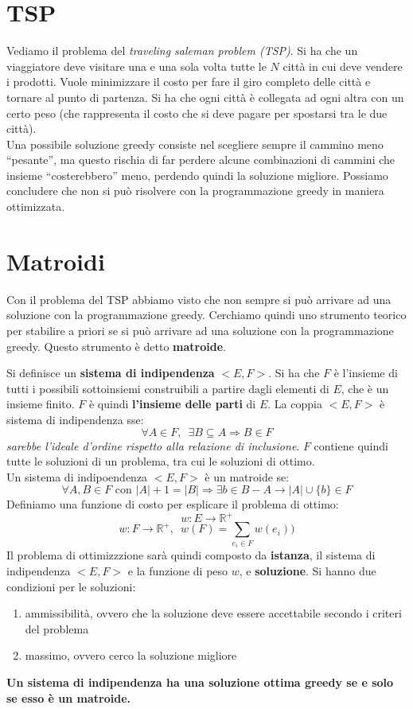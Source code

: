 \documentclass[a4paper,12pt, oneside]{book}
\begin{document}
\section{TSP}
Vediamo il problema del \textit{traveling saleman problem (TSP)}. Si
ha che un viaggiatore deve visitare una e una sola volta tutte le $N$
città in cui deve vendere i prodotti. Vuole minimizzare il costo per
fare il giro completo delle città e tornare al punto di partenza. Si
ha che ogni città è collegata ad ogni altra con un certo peso (che
rappresenta il costo che si deve pagare per spostarsi tra le due
città).\\
Una possibile soluzione greedy consiste nel scegliere sempre il
cammino meno ``pesante'', ma questo rischia di far perdere alcune
combinazioni di cammini che insieme ``costerebbero'' meno, perdendo
quindi la soluzione migliore. Possiamo concludere che non si può
risolvere con la programmazione greedy in maniera ottimizzata.
\section{Matroidi}
Con il problema del TSP abbiamo visto che non sempre si può arrivare
ad una soluzione con la programmazione greedy. Cerchiamo quindi uno
strumento teorico per stabilire a priori se si può arrivare ad una
soluzione con la programmazione greedy. Questo strumento è detto
\textbf{matroide}.
\begin{definizione}
  Si definisce un \textbf{sistema di indipendenza} $<E,F>$. Si ha che
  $F$ è l'insieme di tutti i possibili sottoinsiemi construibili a
  partire dagli elementi di $E$, che è un insieme finito. $F$ è quindi
  \textbf{l'insieme delle parti} di $E$. La coppia $<E,F>$ è sistema
  di indipendenza sse:
  \[\forall A\in F,\,\,\, \exists B\subseteq A\Rightarrow B\in F\]
  \textit{sarebbe l'ideale d’ordine rispetto alla relazione di
    inclusione}. $F$ contiene quindi tutte le soluzioni di un
  problema, tra cui le soluzioni di ottimo.\\
  Un sistema di indipoendenza $<E,F>$ è un matroide se:
  \[\forall A,B\in F\mbox{ con }|A|+1=|B|\Longrightarrow\exists b\in
    B-A\to |A|\cup \{b\}\in F\]
  Definiamo una funzione di costo per esplicare il problema di
  ottimo:
  \[w:E\to \mathbb{R}^+\]
  \[w:F\to \mathbb{R}^+,\,\,\,w(F)=\sum_{e_i\in F}w(e_i))\]
  Il problema di ottimizzzione sarà quindi composto da
  \textbf{istanza}, il sistema di indipendenza $<E,F>$ e la funzione
  di peso $w$, e \textbf{soluzione}. Si hanno due condizioni per le
  soluzioni:
  \begin{enumerate}
    \item ammissibilità, ovvero che la soluzione deve essere
    accettabile secondo i criteri del problema
    \item massimo, ovvero cerco la soluzione migliore
  \end{enumerate}
  \textbf{Un sistema di indipendenza
    ha una soluzione ottima greedy se e solo se esso è un matroide.}
\end{definizione}
\end{document}

